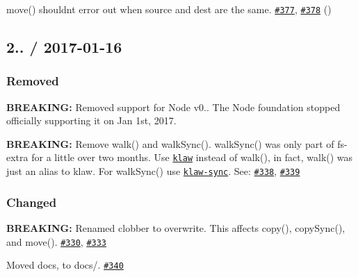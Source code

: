 \begin{DoxyItemize}
\item {\ttfamily move()} shouldn\textquotesingle{}t error out when source and dest are the same. \href{https://github.com/jprichardson/node-fs-extra/issues/377}{\tt \#377}, \href{https://github.com/jprichardson/node-fs-extra/pull/378}{\tt \#378} (\href{https://github.com/jdalton}{\tt })
\end{DoxyItemize}

\subsection*{2.. / 2017-\/01-\/16 }

\subsubsection*{Removed}


\begin{DoxyItemize}
\item {\bfseries B\+R\+E\+A\+K\+I\+NG\+:} Removed support for Node {\ttfamily v0.}. The Node foundation stopped officially supporting it on Jan 1st, 2017.
\item {\bfseries B\+R\+E\+A\+K\+I\+NG\+:} Remove {\ttfamily walk()} and {\ttfamily walk\+Sync()}. {\ttfamily walk\+Sync()} was only part of {\ttfamily fs-\/extra} for a little over two months. Use \href{https://github.com/jprichardson/node-klaw}{\tt klaw} instead of {\ttfamily walk()}, in fact, {\ttfamily walk()} was just an alias to klaw. For {\ttfamily walk\+Sync()} use \href{https://github.com/mawni/node-klaw-sync}{\tt klaw-\/sync}. See\+: \href{https://github.com/jprichardson/node-fs-extra/issues/338}{\tt \#338}, \href{https://github.com/jprichardson/node-fs-extra/pull/339}{\tt \#339}
\end{DoxyItemize}

\subsubsection*{Changed}


\begin{DoxyItemize}
\item {\bfseries B\+R\+E\+A\+K\+I\+NG\+:} Renamed {\ttfamily clobber} to {\ttfamily overwrite}. This affects {\ttfamily copy()}, {\ttfamily copy\+Sync()}, and {\ttfamily move()}. \href{https://github.com/jprichardson/node-fs-extra/pull/330}{\tt \#330}, \href{https://github.com/jprichardson/node-fs-extra/pull/333}{\tt \#333}
\item Moved docs, to {\ttfamily docs/}. \href{https://github.com/jprichardson/node-fs-extra/pull/340}{\tt \#340}
\end{DoxyItemize}

